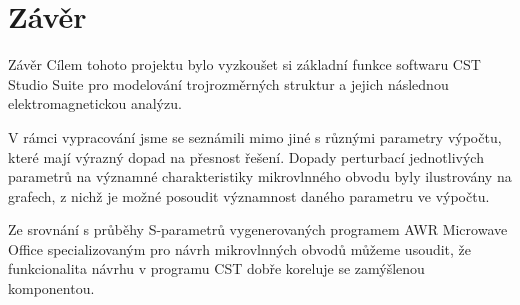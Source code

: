\documentclass[aspectratio=169, 11pt, hyperref={unicode}]{beamer}
\begin{document}
\section{Závěr}
\begin{frame}{Závěr}
	Cílem tohoto projektu bylo vyzkoušet si základní funkce softwaru CST Studio Suite pro modelování trojrozměrných struktur a jejich následnou elektromagnetickou analýzu.
    
    V rámci vypracování jsme se seznámili mimo jiné s různými parametry výpočtu, které mají výrazný dopad na přesnost řešení. Dopady perturbací jednotlivých parametrů na významné charakteristiky mikrovlnného obvodu byly ilustrovány na grafech, z nichž je možné posoudit významnost daného parametru ve výpočtu.

    Ze srovnání s průběhy S-parametrů vygenerovaných programem AWR Microwave Office specializovaným pro návrh mikrovlnných obvodů můžeme usoudit, že funkcionalita návrhu v programu CST dobře koreluje se zamýšlenou komponentou.
\end{frame}

\end{document}
